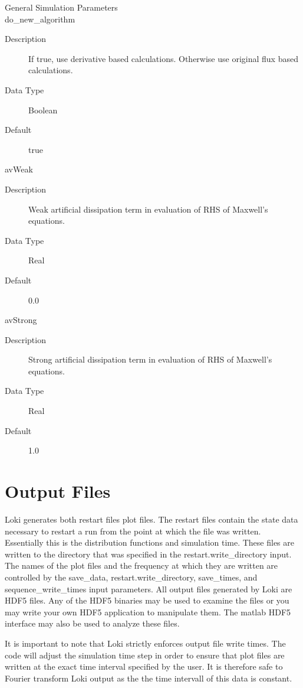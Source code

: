 \documentclass[11pt]{amsart}
\begin{document}
\noindent General Simulation Parameters \\
\indent do\_new\_algorithm
\begin{description}
\item [Description] If true, use derivative based calculations.  Otherwise use
original flux based calculations.
\item [Data Type] Boolean
\item [Default] true
\end{description}

avWeak
\begin{description}
\item [Description] Weak artificial dissipation term in evaluation of RHS of
Maxwell's equations.
\item [Data Type] Real
\item [Default] 0.0
\end{description}

avStrong
\begin{description}
\item [Description] Strong artificial dissipation term in evaluation of RHS of
Maxwell's equations.
\item [Data Type] Real
\item [Default] 1.0
\end{description}

\section*{Output Files}
Loki generates both restart files plot files.  The restart files contain the
state data necessary to restart a run from the point at which the file was
written.  Essentially this is the distribution functions and simulation time.
These files are written to the directory that was specified in the
restart.write\_directory input.  The names of the plot files and the frequency
at which they are written are controlled by the save\_data,
restart.write\_directory, save\_times, and sequence\_write\_times input
parameters.  All output files generated by Loki are HDF5 files.  Any of the
HDF5 binaries may be used to examine the files or you may write your own HDF5
application to manipulate them.  The matlab HDF5 interface may also be used to
analyze these files.

It is important to note that Loki strictly enforces output file write times.
The code will adjust the simulation time step in order to ensure that plot
files are written at the exact time interval specified by the user.  It is
therefore safe to Fourier transform Loki output as the the time intervall of
this data is constant.
\end{document}
